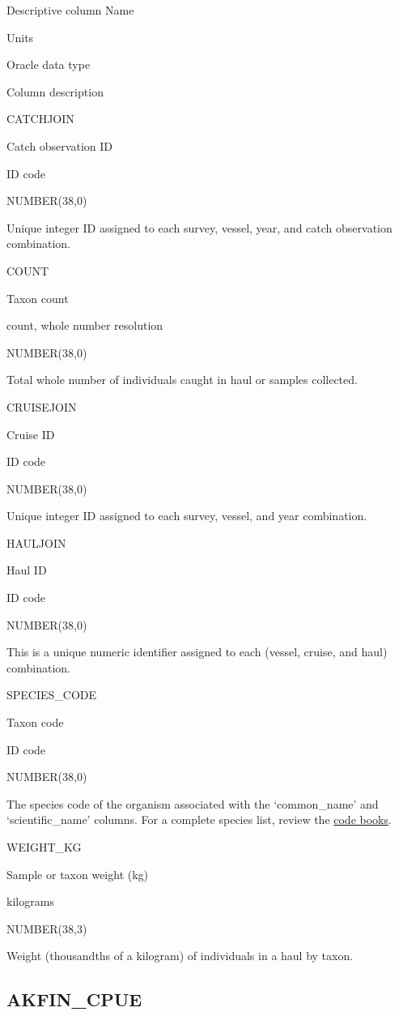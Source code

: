 \documentclass[
  letterpaper,
  oneside,
  open=any]{scrbook}
\begin{document}
Descriptive column Name

Units

Oracle data type

Column description

CATCHJOIN

Catch observation ID

ID code

NUMBER(38,0)

Unique integer ID assigned to each survey, vessel, year, and catch
observation combination.

COUNT

Taxon count

count, whole number resolution

NUMBER(38,0)

Total whole number of individuals caught in haul or samples collected.

CRUISEJOIN

Cruise ID

ID code

NUMBER(38,0)

Unique integer ID assigned to each survey, vessel, and year combination.

HAULJOIN

Haul ID

ID code

NUMBER(38,0)

This is a unique numeric identifier assigned to each (vessel, cruise,
and haul) combination.

SPECIES\_CODE

Taxon code

ID code

NUMBER(38,0)

The species code of the organism associated with the `common\_name' and
`scientific\_name' columns. For a complete species list, review the
\href{https://www.fisheries.noaa.gov/resource/document/groundfish-survey-species-code-manual-and-data-codes-manual}{code
books}.

WEIGHT\_KG

Sample or taxon weight (kg)

kilograms

NUMBER(38,3)

Weight (thousandths of a kilogram) of individuals in a haul by taxon.

\hypertarget{akfin_cpue}{%
\subsection{AKFIN\_CPUE}\label{akfin_cpue}}
\end{document}
